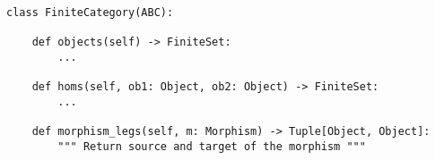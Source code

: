 \begin{verbatim}
class FiniteCategory(ABC):

    def objects(self) -> FiniteSet:
        ...

    def homs(self, ob1: Object, ob2: Object) -> FiniteSet:
        ...

    def morphism_legs(self, m: Morphism) -> Tuple[Object, Object]:
        """ Return source and target of the morphism """
\end{verbatim}